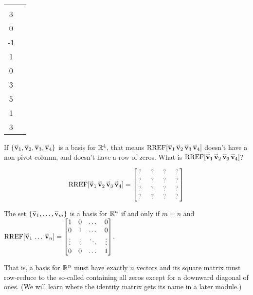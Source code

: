 \begin{activity}{15}
\begin{center}
\begin{tabular}{cc}
     \(E=\left\{
      \begin{bmatrix}5\\3\\0\\-1\end{bmatrix},
      \begin{bmatrix}-2\\1\\0\\3\end{bmatrix},
      \begin{bmatrix}4\\5\\1\\3\end{bmatrix}
      \right\}
      \)  &
    \end{tabular}
  \end{center}
\end{activity}

\begin{activity}{10}
  If \(\{\mathbf{\accentset{\rightharpoonup}{v}}_1,\mathbf{\accentset{\rightharpoonup}{v}}_2,\mathbf{\accentset{\rightharpoonup}{v}}_3,\mathbf{\accentset{\rightharpoonup}{v}}_4\}\) is a basis for
  \(\mathbb{R}^4\), that means \(\operatorname{RREF}[\mathbf{\accentset{\rightharpoonup}{v}}_1\,\mathbf{\accentset{\rightharpoonup}{v}}_2\,\mathbf{\accentset{\rightharpoonup}{v}}_3\,\mathbf{\accentset{\rightharpoonup}{v}}_4]\)
  doesn't have a non-pivot column, and doesn't have a
  row of zeros. What is \(\operatorname{RREF}[\mathbf{\accentset{\rightharpoonup}{v}}_1\,\mathbf{\accentset{\rightharpoonup}{v}}_2\,\mathbf{\accentset{\rightharpoonup}{v}}_3\,\mathbf{\accentset{\rightharpoonup}{v}}_4]\)?

  \[
    \RREF[\vect v_1\,\vect v_2\,\vect v_3\,\vect v_4]
      =
    \begin{bmatrix}
      \unknown & \unknown & \unknown & \unknown \\
      \unknown & \unknown & \unknown & \unknown \\
      \unknown & \unknown & \unknown & \unknown \\
      \unknown & \unknown & \unknown & \unknown \\
    \end{bmatrix}
  \]
\end{activity}

\begin{fact}
  The set \(\{\mathbf{\accentset{\rightharpoonup}{v}}_1,\dots,\mathbf{\accentset{\rightharpoonup}{v}}_m\}\) is a basis for \(\mathbb{R}^n\) if and
  only if \(m=n\) and
  \(\operatorname{RREF}[\mathbf{\accentset{\rightharpoonup}{v}}_1\,\dots\,\mathbf{\accentset{\rightharpoonup}{v}}_n]=
  \begin{bmatrix}
    1&0&\dots&0\\
    0&1&\dots&0\\
    \vdots&\vdots&\ddots&\vdots\\
    0&0&\dots&1
  \end{bmatrix}
  \).

  That is, a basis for \(\mathbb{R}^n\) must have exactly \(n\) vectors and
  its square matrix must row-reduce to the so-called 
  containing all zeros except for a downward diagonal of ones.
  (We will learn where the identity matrix gets its name in a later module.)
\end{fact}

